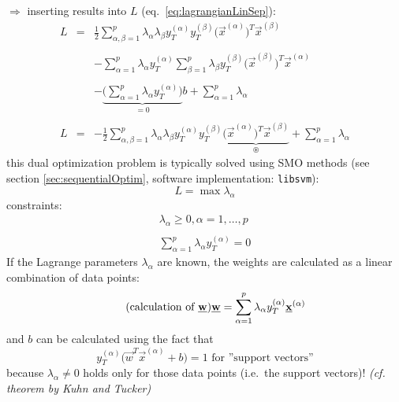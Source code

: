 $\Rightarrow$ inserting results into $L$ (eq.~\ref{eq:lagrangianLinSep}):
\begin{equation}
	\begin{array}{lcl}
	L & = & \frac{1}{2} \sum\limits_{\alpha,\beta = 1}^p \lambda_\alpha
		\lambda_\beta y_T^{(\alpha)} y_T^{(\beta)} 
		\Big( \vec{x}^{(\alpha)} \Big)^T \vec{x}^{(\beta)} \\\\
	&& -\sum\limits_{\alpha = 1}^p \lambda_\alpha y_T^{(\alpha)} 
		\sum\limits_{\beta = 1}^p \lambda_\beta y_T^{(\beta)} 
		\Big( \vec{x}^{(\beta)} \Big)^T \vec{x}^{(\alpha)} \\\\
	&& - \underbrace{ \Bigg( \sum\limits_{\alpha = 1}^p \lambda_\alpha 
			y_T^{(\alpha)} \Bigg) }_{ = 0 }
		b + \sum\limits_{\alpha = 1}^p \lambda_\alpha \\\\
	L & = & -\frac{1}{2} \sum\limits_{\alpha, \beta = 1}^p 
		\lambda_\alpha \lambda_\beta y_T^{(\alpha)}
		y_T^{(\beta)} 
		\underbrace{\Big( \vec{x}^{(\alpha)} \Big)^T 
			\vec{x}^{(\beta)}}_{ \circledast }
		+ \sum\limits_{\alpha = 1}^p \lambda_\alpha
	\end{array}
\end{equation}
this dual optimization problem is typically solved using SMO methods (see section \ref{sec:sequentialOptim}, software implementation: \texttt{libsvm}):
\begin{equation}
	L = \max \lambda_\alpha
\end{equation}
constraints:
\[ \begin{array}{l}
	\lambda_\alpha \geq 0, \alpha = 1, \ldots, p \\\\
	\sum\limits_{\alpha = 1}^p \lambda_\alpha y_T^{(\alpha)} = 0
\end{array} \]
If the Lagrange parameters $\lambda_\alpha$ are known, the weights are calculated as a linear combination of data points:
\begin{equation} \tag{calculation of $\vec{w}$}
	\vec{w} = \sum\limits_{\alpha = 1}^p \lambda_\alpha 
		y_T^{(\alpha)} \vec{x}^{(\alpha)}
\end{equation}
and $b$ can be calculated using the fact that
\begin{equation}
	y_T^{(\alpha)} \Big( \vec{w}^T \vec{x}^{(\alpha)} + b \Big) = 1
		\text{ for ''support vectors''}
\end{equation}
because $\lambda_\alpha \neq 0$ holds only for those data points (i.e.\ the support vectors)! {\it (cf. theorem by Kuhn and Tucker)}
